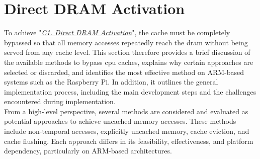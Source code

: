 \section{Direct DRAM Activation} \label{sec:uncached}
    To achieve "\textit{\hyperref[ch:uncached]{C1. Direct DRAM Activation}}", the cache must be completely bypassed so that all memory accesses repeatedly 
    reach the \gls{dram} without being served from any cache level. This section therefore provides a brief 
    discussion of the available methods to bypass \gls{cpu} caches, explains why certain approaches are selected 
    or discarded, and identifies the most effective method on ARM-based systems such as the Raspberry Pi. 
    In addition, it outlines the general implementation process, including the main development steps and 
    the challenges encountered during implementation.
    \\
    From a high-level perspective, several methods are considered and evaluated as potential approaches to 
    achieve uncached memory accesses. These methods include non-temporal accesses, explicitly uncached 
    memory, cache eviction, and cache flushing. Each approach differs in its feasibility, effectiveness, 
    and platform dependency, particularly on ARM-based architectures.

